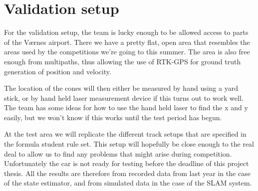 \section{Validation setup}
For the validation setup, the team is lucky enough to be allowed access to parts of the V\ae rnes airport. There we have a pretty flat, open area that resembles the areas used by the competitions we're going to this summer. The area is also free enough from multipaths, thus allowing the use of RTK-GPS for ground truth generation of position and velocity. 

The location of the cones will then either be measured by hand using a yard stick, or by hand held laser measurement device if this turns out to work well. The team has some ideas for how to use the hand held laser to find the x and y easily, but we won't know if this works until the test period has begun. 

At the test area we will replicate the different track setups that are specified in the formula student rule set. This setup will hopefully be close enough to the real deal to allow us to find any problems that might arise during competition. Unfortunately the car is not ready for testing before the deadline of this project thesis. All the results are therefore from recorded data from last year in the case of the state estimator, and from simulated data in the case of the SLAM system. 

